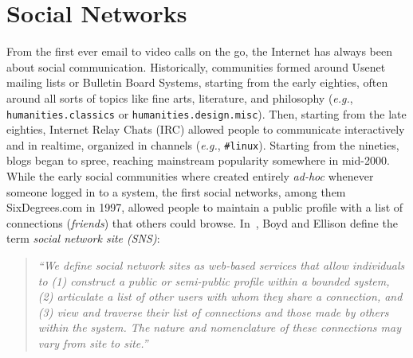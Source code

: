 

\chapter{Social Networks} \label{cha:social-networks}

\ifpdf
    \graphicspath{{3_social_networks/figures/PNG/}{3_social_networks/figures/PDF/}{3_social_networks/figures/}}
\else
    \graphicspath{{3_social_networks/figures/EPS/}{3_social_networks/figures/}}
\fi


From the first ever email to video calls on the go,
the Internet has always been about social communication.
Historically, communities formed around Usenet mailing lists or Bulletin Board Systems,
starting from the early eighties, often around all sorts of topics like fine arts,
literature, and philosophy (\emph{e.g.}, \texttt{humanities.classics}
or \texttt{humanities.design.misc}).
Then, starting from the late eighties, Internet Relay Chats (IRC)
allowed people to communicate interactively and in realtime, organized in channels
(\emph{e.g.}, \texttt{\#linux}).
Starting from the nineties, blogs began to spree,
reaching mainstream popularity somewhere in mid-2000.
While the early social communities where created entirely \emph{ad-hoc} whenever someone logged in to a system,
the first social networks, among them SixDegrees.com in 1997,
allowed people to maintain a public profile
with a list of connections (\emph{friends}) that others could browse.
In~\cite{Ellison2007}, Boyd and Ellison define the term \emph{social network site (SNS)}:
\begin{quotation}
\textit{``We define social network sites as web-based services that allow individuals to
(1) construct a public or semi-public profile within a bounded system,
(2) articulate a list of other users with whom they share a connection, and
(3) view and traverse their list of connections and those made by others within the system.
The nature and nomenclature of these connections may vary from site to site.''}
\end{quotation}


